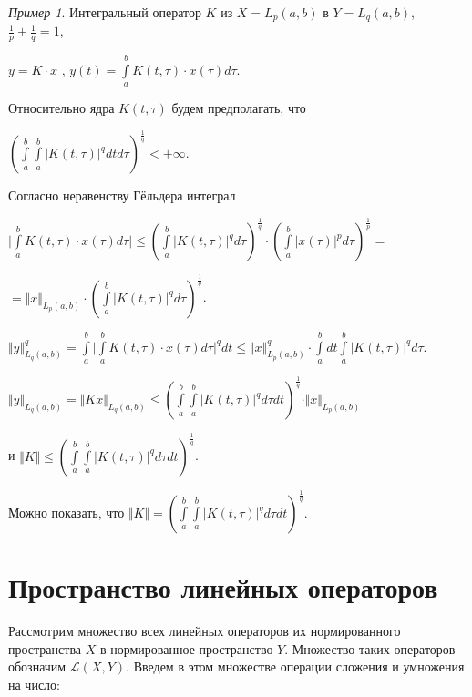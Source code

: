 \documentclass[12pt,a4paper,titlepage,oneside]{book}
\theoremstyle{definition}
\theoremstyle{plain}
\theoremstyle{break}
\theoremstyle{remark}
\theoremstyle{remark}
\newtheorem*{example}{Пример}
\theoremstyle{remark}
\theoremstyle{remark}
\theoremstyle{plain}
\theoremstyle{plain}
\begin{document}
\begin{example}
Интегральный оператор $K$ из $X=L_p(a,b)$ в $Y=L_q(a,b)$, $
\frac{1}{p}+\frac{1}{q}=1$,
\begin{center}
$y=K\cdot x$ , $ y(t)=\displaystyle\int\limits_a^b K(t,\tau)\cdot x(\tau)d\tau$.
\end{center}

Относительно ядра $K(t,\tau)$ будем предполагать, что 
\begin{center}
${(\displaystyle\int\limits_a^b \displaystyle\int\limits_a^b {\vert K(t,\tau)\vert} ^q dtd\tau)^\frac{1}{q}} <+\infty$.
\end{center}

Согласно неравенству Гёльдера интеграл 
\begin{center}
$\vert \displaystyle\int\limits_a^b K(t,\tau)\cdot x(\tau)d\tau \vert \leqslant (\displaystyle\int\limits_a^b {\vert K(t,\tau)\vert} ^q d\tau)^\frac{1}{q} \cdot {(\displaystyle\int\limits_a^b {\vert x(\tau)\vert} ^p d\tau)^\frac{1}{p}=}$

$= \Vert x \Vert _{L_p(a,b)}\cdot (\displaystyle\int\limits_a^b {\vert K(t,\tau)\vert} ^q d\tau)^\frac{1}{q}$.

${\Vert y \Vert}^q _{L_q(a,b)}=\displaystyle\int\limits_a^b {\vert \displaystyle\int\limits_a^b K(t,\tau)\cdot x(\tau)d\tau \vert^{q}} dt\leq {\Vert x \Vert}^q _{L_p(a,b)} \cdot \displaystyle\int\limits_a^b dt \displaystyle\int\limits_a^b {\vert K(t,\tau)\vert} ^q d\tau$.

${\Vert y \Vert}_{L_q(a,b)}=
{\Vert Kx\Vert}_{L_q(a,b)} \leqslant {(\displaystyle\int\limits_a^b \displaystyle\int\limits_a^b {\vert K(t,\tau)\vert} ^q d\tau dt)^\frac{1}{q}}\cdot \Vert x \Vert _{L_p(a,b)} $ 
\end{center}
и $\Vert K \Vert \leqslant {(\displaystyle\int\limits_a^b \displaystyle\int\limits_a^b {\vert K(t,\tau)\vert} ^q d\tau dt)^\frac{1}{q}}$.

Можно показать, что $\Vert K \Vert = 
{(\displaystyle\int\limits_a^b \displaystyle\int\limits_a^b {\vert K(t,\tau)\vert} ^q d\tau dt)^\frac{1}{q}}.$
\end{example}

\section{Пространство линейных операторов}
Рассмотрим множество всех линейных операторов их нормированного пространства $X$ в нормированное пространство $Y$. Множество таких операторов обозначим $\mathcal{L}(X,Y)$. Введем в этом множестве операции сложения и умножения на число:
\end{document}
